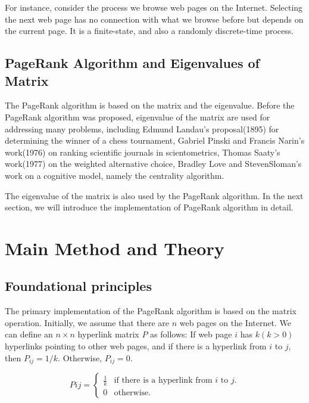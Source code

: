 \documentclass[lettersize,journal,12pt,conference]{IEEEtran}
\begin{document}
For instance, consider the process we browse web pages on the Internet. Selecting the next web page has no connection with what we browse before but depends on the current page.
It is a finite-state, and also a randomly discrete-time process.

\subsection{PageRank Algorithm and Eigenvalues of Matrix}

The PageRank algorithm is based on the matrix and the eigenvalue. Before the PageRank algorithm was proposed, eigenvalue of the matrix are used for addressing many problems, including Edmund Landau's proposal(1895) for determining the winner of a chess tournament, Gabriel Pinski and Francis Narin's work(1976) on ranking scientific journals in scientometrics, Thomas Saaty's work(1977) on the weighted alternative choice, Bradley Love and StevenSloman's work on a cognitive model, namely the centrality algorithm.

The eigenvalue of the matrix is also used by the PageRank algorithm. In the next section, we will introduce the implementation of PageRank algorithm in detail.

\section{Main Method and Theory}

\subsection{Foundational principles}

The primary implementation of the PageRank algorithm is based on the matrix operation.
Initially, we assume that there are $n$ web pages on the Internet. We can define an $n \times n$ hyperlink matrix $P$ as follows: If web page $i$ has $k (k > 0)$ hyperlinks pointing to other web pages, and if there is a hyperlink from $i$ to $j$, then $P_{ij} = 1/k$. Otherwise, $P_{ij} = 0$.

\begin{equation}
	\label{eq:1}
	Pij = 
	\begin{cases}
		\frac{1}{k} & \text{if there is a hyperlink from $i$ to $j$.} \\
		0 & \text{otherwise.}
	\end{cases}
\end{equation}
\end{document}
